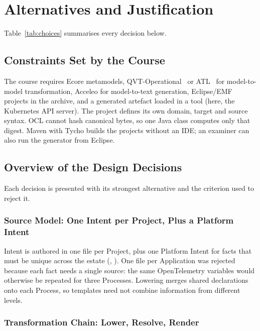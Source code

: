 \section{Alternatives and Justification}
\label{sec:alternatives}

Table~\ref{tab:choices} summarises every decision below.

\subsection{Constraints Set by the Course}
\label{sec:fixed}

The course requires Ecore metamodels, QVT-Operational~\cite{qvt} or ATL~\cite{atl} for model-to-model
transformation, Acceleo for model-to-text generation, Eclipse/EMF projects in the archive,
and a generated artefact loaded in a tool (here, the Kubernetes API server). The project
defines its own domain, target and source syntax. OCL cannot hash canonical bytes, so
one Java class computes only that digest. Maven with Tycho builds the projects
without an IDE; an examiner can also run the generator from Eclipse.

\subsection{Overview of the Design Decisions}
\label{sec:shape}

Each decision is presented with its strongest alternative and the criterion used to
reject it.

\subsubsection{Source Model: One Intent per Project, Plus a Platform Intent}
\label{sec:shape-source}

Intent is authored in one file per Project, plus one Platform Intent for facts that
must be unique across the estate
(, ). One
file per Application was rejected because each fact needs a single source: the same
OpenTelemetry variables would otherwise be repeated for three Processes. Lowering
merges shared declarations onto each Process, so templates need not combine
information from different levels.

\subsubsection{Transformation Chain: Lower, Resolve, Render}
\label{sec:shape-stages}

